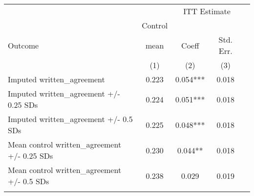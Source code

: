 \begin{tabular}{lcccc}
\hline \noalign{\smallskip} &  & \multicolumn{2}{c}{{ ITT Estimate}} & \\
\cline{3-4} & Control &  &  & \\
Outcome & mean & Coeff & Std. Err. & \\
 & (1) & (2) & (3) & \\
\noalign{\smallskip}\hline \noalign{\smallskip}Imputed written\_agreement & 0.223 & 0.054*** & 0.018 & \\
Imputed written\_agreement +/- 0.25 SDs & 0.224 & 0.051*** & 0.018 & \\
Imputed written\_agreement +/- 0.5 SDs & 0.225 & 0.048*** & 0.018 & \\
Mean control written\_agreement +/- 0.25 SDs & 0.230 & 0.044** & 0.018 & \\
Mean control written\_agreement +/- 0.5 SDs & 0.238 & 0.029 & 0.019 & \\
\noalign{\smallskip}\hline\end{tabular}\\
